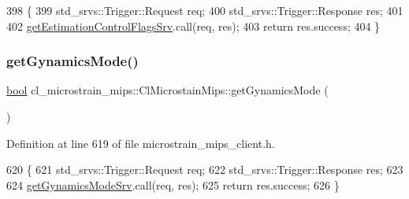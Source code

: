 \begin{DoxyCode}
398     \{
399         std\_srvs::Trigger::Request req;
400         std\_srvs::Trigger::Response res;
401 
402         \hyperlink{classcl__microstrain__mips_1_1ClMicrostainMips_a64039ee26cf8a290b3c22b787b8868a5}{getEstimationControlFlagsSrv}.call(req, res);
403         \textcolor{keywordflow}{return} res.success;
404     \}
\end{DoxyCode}
\mbox{\label{classcl__microstrain__mips_1_1ClMicrostainMips_a3a0425423b14461be52bc9b6c0f118bc}} 
\subsubsection{\texorpdfstring{get\+Gynamics\+Mode()}{getGynamicsMode()}}
{\footnotesize\ttfamily \hyperlink{classbool}{bool} cl\+\_\+microstrain\+\_\+mips\+::\+Cl\+Microstain\+Mips\+::get\+Gynamics\+Mode (\begin{DoxyParamCaption}{ }\end{DoxyParamCaption})\hspace{0.3cm}{\ttfamily [inline]}}



Definition at line 619 of file microstrain\+\_\+mips\+\_\+client.\+h.


\begin{DoxyCode}
620     \{
621         std\_srvs::Trigger::Request req;
622         std\_srvs::Trigger::Response res;
623 
624         \hyperlink{classcl__microstrain__mips_1_1ClMicrostainMips_a5ded1b1b3506d16e56d312b3d1a7fe13}{getGynamicsModeSrv}.call(req, res);
625         \textcolor{keywordflow}{return} res.success;
626     \}
\end{DoxyCode}
\mbox{\label{classcl__microstrain__mips_1_1ClMicrostainMips_aaa1e9015c879e48776a803f55add33e2}} 
